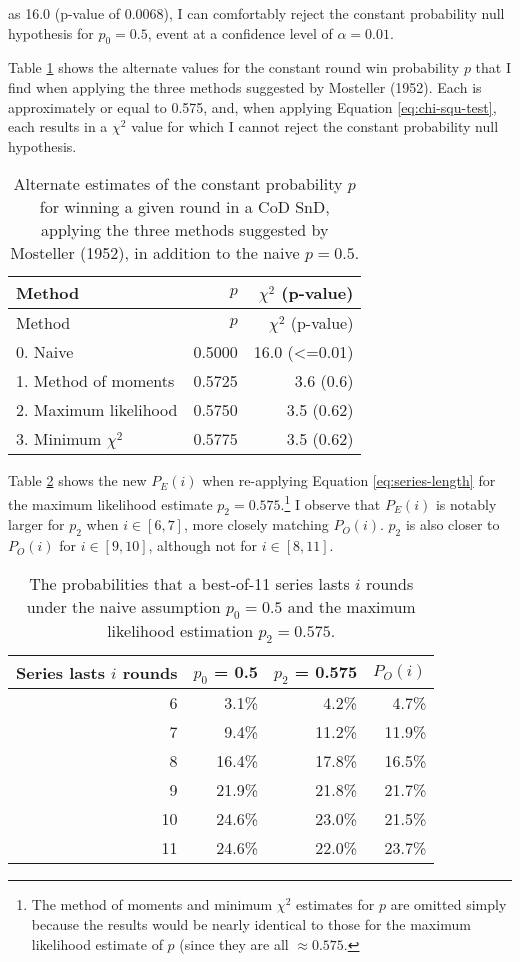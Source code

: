 \documentclass{article}
\begin{document}
as 16.0 (p-value of 0.0068), I can comfortably reject the constant
probability null hypothesis for \(p_0 = 0.5\), event at a confidence
level of \(\alpha = 0.01\).

Table \ref{tbl:mosteller-methods-results} shows the alternate values for
the constant round win probability \(p\) that I find when applying the
three methods suggested by Mosteller (1952). Each is approximately or
equal to 0.575, and, when applying Equation \ref{eq:chi-squ-test}, each
results in a \(\chi^2\) value for which I cannot reject the constant
probability null hypothesis.

\begin{longtable}[]{@{}lrr@{}}
\caption{Alternate estimates of the constant probability \(p\) for winning a given round in a CoD SnD, applying the three methods suggested by Mosteller (1952), in addition to the naive \(p = 0.5\).}\label{tbl:mosteller-methods-results} \\
\toprule()
Method & \(p\) & \(\chi^2\) (p-value) \\
\midrule()
\endfirsthead
\toprule()
Method & \(p\) & \(\chi^2\) (p-value) \\
\midrule()
\endhead
0. Naive & 0.5000 & 16.0 (\textless=0.01) \\
1. Method of moments & 0.5725 & 3.6 (0.6) \\
2. Maximum likelihood & 0.5750 & 3.5 (0.62) \\
3. Minimum \(\chi^2\) & 0.5775 & 3.5 (0.62) \\
\bottomrule()
\end{longtable}

Table \ref{tbl:expected-series-lengths-alternative-ps} shows the new
\(P_E(i)\) when re-applying Equation \ref{eq:series-length} for the
maximum likelihood estimate \(p_2 = 0.575\).\footnote{The method of
  moments and minimum \(\chi^2\) estimates for \(p\) are omitted simply
  because the results would be nearly identical to those for the maximum
  likelihood estimate of \(p\) (since they are all \(\approx 0.575\).} I
observe that \(P_E(i)\) is notably larger for \(p_{2}\) when
\(i \in [6, 7]\), more closely matching \(P_O(i)\). \(p_{2}\) is also
closer to \(P_O(i)\) for \(i \in [9, 10]\), although not for
\(i \in [8, 11]\).

\begin{longtable}[]{@{}rrrr@{}}
\caption{The probabilities that a best-of-11 series lasts $i$ rounds under the naive assumption $p_0 = 0.5$ and the maximum likelihood estimation $p_2 = 0.575$.}\label{tbl:expected-series-lengths-alternative-ps} \\
\toprule()
Series lasts \(i\) rounds & \(p_0\) = 0.5 & \(p_2\) = 0.575 & \(P_O(i)\) \\
\midrule()
\endhead
6 & 3.1\% & 4.2\% & 4.7\% \\
7 & 9.4\% & 11.2\% & 11.9\% \\
8 & 16.4\% & 17.8\% & 16.5\% \\
9 & 21.9\% & 21.8\% & 21.7\% \\
10 & 24.6\% & 23.0\% & 21.5\% \\
11 & 24.6\% & 22.0\% & 23.7\% \\
\bottomrule()
\end{longtable}
\end{document}
